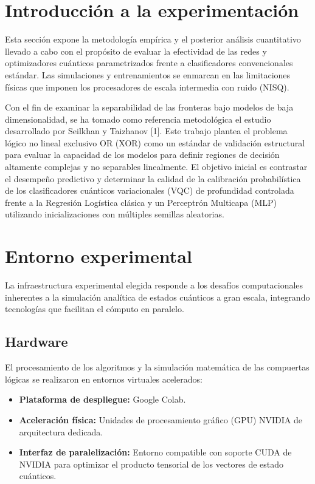 \documentclass[12pt,oneside]{report}
\begin{document}
\section{Introducción a la experimentación}
Esta sección expone la metodología empírica y el posterior análisis cuantitativo llevado a cabo con el propósito de evaluar la efectividad de las redes y optimizadores cuánticos parametrizados frente a clasificadores convencionales estándar. Las simulaciones y entrenamientos se enmarcan en las limitaciones físicas que imponen los procesadores de escala intermedia con ruido (NISQ). 

Con el fin de examinar la separabilidad de las fronteras bajo modelos de baja dimensionalidad, se ha tomado como referencia metodológica el estudio desarrollado por Seilkhan y Taizhanov [1]. Este trabajo plantea el problema lógico no lineal exclusivo OR (XOR) como un estándar de validación estructural para evaluar la capacidad de los modelos para definir regiones de decisión altamente complejas y no separables linealmente. El objetivo inicial es contrastar el desempeño predictivo y determinar la calidad de la calibración probabilística de los clasificadores cuánticos variacionales (VQC) de profundidad controlada frente a la Regresión Logística clásica y un Perceptrón Multicapa (MLP) utilizando inicializaciones con múltiples semillas aleatorias.

\section{Entorno experimental}
La infraestructura experimental elegida responde a los desafíos computacionales inherentes a la simulación analítica de estados cuánticos a gran escala, integrando tecnologías que facilitan el cómputo en paralelo.

\subsection{Hardware}
El procesamiento de los algoritmos y la simulación matemática de las compuertas lógicas se realizaron en entornos virtuales acelerados:
\begin{itemize}
    \item \textbf{Plataforma de despliegue:} Google Colab.
    \item \textbf{Aceleración física:} Unidades de procesamiento gráfico (GPU) NVIDIA de arquitectura dedicada.
    \item \textbf{Interfaz de paralelización:} Entorno compatible con soporte CUDA de NVIDIA para optimizar el producto tensorial de los vectores de estado cuánticos.
\end{itemize}
\end{document}
